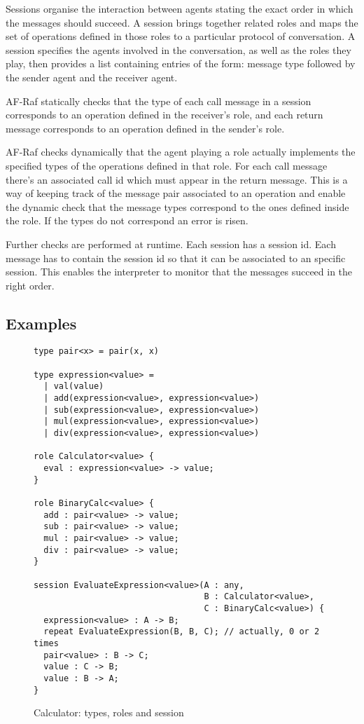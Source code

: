 \documentclass[a4paper,12pt,oneside,fleqn]{book} %
\theoremstyle{plain}
\theoremstyle{definition}
\theoremstyle{remark}
\begin{document}
Sessions organise the interaction between agents stating the exact order in
which the messages should succeed. A session brings together related roles
and maps the set of operations defined in those roles to a particular
protocol of conversation. A session specifies the agents involved in the
conversation, as well as the roles they play, then provides a list
containing entries of the form: message type followed by the sender agent
and the receiver agent.

AF-Raf statically checks that the type of each call message in a session
corresponds to an operation defined in the receiver's role, and each return
message corresponds to an operation defined in the sender's role.

AF-Raf checks dynamically that the agent playing a role actually implements
the specified types of the operations defined in that role.  For each call
message there's an associated call id which must appear in the return
message. This is a way of keeping track of the message pair associated to
an operation and enable the dynamic check that the message types correspond
to the ones defined inside the role. If the types do not correspond an
error is risen.

Further checks are performed at runtime. Each session has a session id.
Each message has to contain the session id so that it can be associated to
an specific session. This enables the interpreter to monitor that the
messages succeed in the right order.


\subsection{Examples} %

\begin{figure}\footnotesize %
\begin{verbatim}
type pair<x> = pair(x, x)

type expression<value> =
  | val(value)
  | add(expression<value>, expression<value>)
  | sub(expression<value>, expression<value>)
  | mul(expression<value>, expression<value>)
  | div(expression<value>, expression<value>)
        
role Calculator<value> {
  eval : expression<value> -> value;
}

role BinaryCalc<value> {
  add : pair<value> -> value;
  sub : pair<value> -> value;
  mul : pair<value> -> value;
  div : pair<value> -> value;
}

session EvaluateExpression<value>(A : any, 
                                  B : Calculator<value>,
                                  C : BinaryCalc<value>) {
  expression<value> : A -> B;
  repeat EvaluateExpression(B, B, C); // actually, 0 or 2 times
  pair<value> : B -> C;
  value : C -> B;
  value : B -> A;
}
\end{verbatim}
\caption{Calculator: types, roles and session}
\label{fig:Calculator}
\end{figure} %
\end{document}
